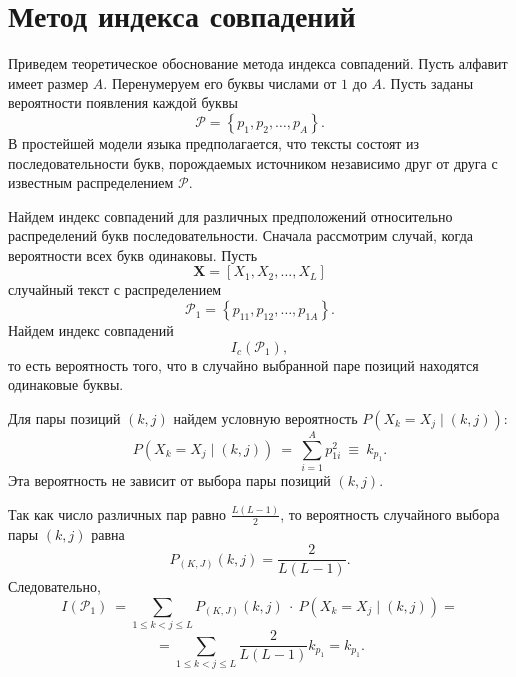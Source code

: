 \section{Метод индекса совпадений}
\label{chap:coincide-index}

Приведем теоретическое обоснование метода индекса совпадений. Пусть алфавит имеет размер $A$. Перенумеруем его буквы числами от $1$ до $A$. Пусть заданы вероятности появления каждой буквы
    \[ \mathcal{P} = \left\{ {p_1 ,p_2 ,  \ldots , p_A } \right\}. \]
В простейшей модели языка предполагается, что тексты состоят из последовательности букв, порождаемых источником независимо друг от друга с известным распределением $\mathcal{P}$.

Найдем индекс совпадений для различных предположений относительно распределений букв последовательности. Сначала рассмотрим случай, когда вероятности всех букв одинаковы. Пусть
    \[ \mathbf{X} = \left[ X_1, X_2, \dots, X_L \right] \]
случайный текст с распределением
    \[ \mathcal{P}_1 = \left\{ p_{11}, p_{12}, \dots, p_{1A} \right\}. \]
Найдем индекс совпадений
    \[ I_c(\mathcal{P}_1), \]
то есть вероятность того, что в случайно выбранной паре позиций находятся одинаковые буквы.

Для пары позиций $(k,j)$ найдем условную вероятность $P \left( X_k  = X_j \mid (k,j) \right)$:
    \[ P \left( X_k  = X_j \mid (k,j) \right) ~=~ \sum\limits_{i=1}^A p_{1i}^2 ~\equiv~ k_{p_1}. \]
Эта вероятность не зависит от выбора пары позиций $(k,j)$.

Так как число различных пар равно $\frac{L(L - 1)}{2}$, то вероятность случайного выбора пары $(k,j)$  равна
    \[ P_{(K,J)} (k,j) = \frac{2}{L(L - 1)}. \]
Следовательно,
\[
    I(\mathcal{P}_1) ~= \sum \limits_{1 \leq k < j \leq L} P_{(K,J)}(k,j) ~\cdot~ P(X_k  = X_j \mid (k,j)) =
\] \[
    = \sum \limits_{1 \leq k < j \leq L} \frac{2}{L(L - 1)} k_{p_1} = k_{p_1}.
\]

